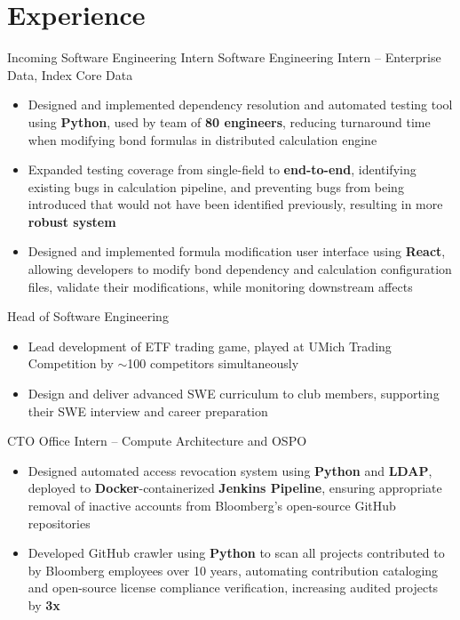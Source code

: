 \documentclass[letterpaper,11pt]{article}
\begin{document}
\section{Experience}
{Incoming Software Engineering Intern}{}
{Software Engineering Intern -- Enterprise Data, Index Core Data}{}
\begin{itemize}
  \item Designed and implemented dependency resolution and automated testing
        tool using \textbf{Python}, used by team of \textbf{80 engineers},
        reducing turnaround time when modifying bond formulas in distributed
        calculation engine
  \item Expanded testing coverage from single-field to \textbf{end-to-end}, identifying
        existing bugs in calculation pipeline, and preventing bugs from being
        introduced that would not have been identified previously, resulting in
        more \textbf{robust system}
  \item Designed and implemented formula modification user interface using
        \textbf{React}, allowing developers to modify bond dependency and
        calculation configuration files, validate their modifications, while
        monitoring downstream affects
\end{itemize}
{Head of Software Engineering}{}
\begin{itemize}
  \item Lead development of ETF trading game, played at UMich Trading Competition
        by $\sim$100 competitors simultaneously
  \item Design and deliver advanced SWE curriculum to club members, supporting
        their SWE interview and career preparation
\end{itemize}
{CTO Office Intern -- Compute Architecture and OSPO}{}
\begin{itemize}
  \item Designed automated access revocation system using \textbf{Python} and
        \textbf{LDAP}, deployed to \textbf{Docker}-containerized
        \textbf{Jenkins Pipeline}, ensuring appropriate removal of inactive
        accounts from Bloomberg's open-source GitHub repositories
  \item Developed GitHub crawler using \textbf{Python} to scan all projects
        contributed to by Bloomberg employees over 10 years, automating
        contribution cataloging and open-source license compliance
        verification, increasing audited projects by \textbf{3x}
\end{itemize}
\end{document}
